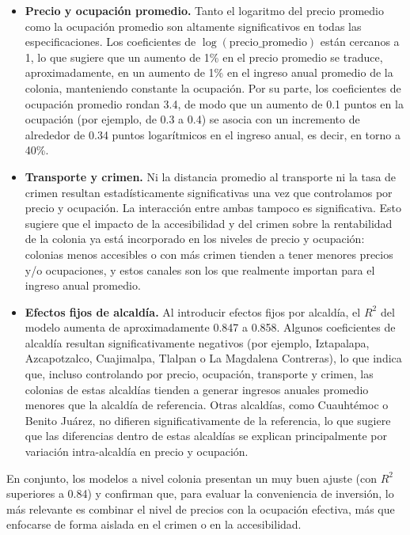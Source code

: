 \documentclass[12pt]{article}
\begin{document}
\begin{itemize}
  \item \textbf{Precio y ocupación promedio.} Tanto el logaritmo del precio promedio como la ocupación promedio son altamente significativos en todas las especificaciones. Los coeficientes de \(\log(\text{precio\_promedio})\) están cercanos a 1, lo que sugiere que un aumento de 1\% en el precio promedio se traduce, aproximadamente, en un aumento de 1\% en el ingreso anual promedio de la colonia, manteniendo constante la ocupación. Por su parte, los coeficientes de ocupación promedio rondan 3.4, de modo que un aumento de 0.1 puntos en la ocupación (por ejemplo, de 0.3 a 0.4) se asocia con un incremento de alrededor de 0.34 puntos logarítmicos en el ingreso anual, es decir, en torno a 40\%.
  \item \textbf{Transporte y crimen.} Ni la distancia promedio al transporte ni la tasa de crimen resultan estadísticamente significativas una vez que controlamos por precio y ocupación. La interacción entre ambas tampoco es significativa. Esto sugiere que el impacto de la accesibilidad y del crimen sobre la rentabilidad de la colonia ya está incorporado en los niveles de precio y ocupación: colonias menos accesibles o con más crimen tienden a tener menores precios y/o ocupaciones, y estos canales son los que realmente importan para el ingreso anual promedio.
  \item \textbf{Efectos fijos de alcaldía.} Al introducir efectos fijos por alcaldía, el \(R^2\) del modelo aumenta de aproximadamente 0.847 a 0.858. Algunos coeficientes de alcaldía resultan significativamente negativos (por ejemplo, Iztapalapa, Azcapotzalco, Cuajimalpa, Tlalpan o La Magdalena Contreras), lo que indica que, incluso controlando por precio, ocupación, transporte y crimen, las colonias de estas alcaldías tienden a generar ingresos anuales promedio menores que la alcaldía de referencia. Otras alcaldías, como Cuauhtémoc o Benito Juárez, no difieren significativamente de la referencia, lo que sugiere que las diferencias dentro de estas alcaldías se explican principalmente por variación intra-alcaldía en precio y ocupación.
\end{itemize}

En conjunto, los modelos a nivel colonia presentan un muy buen ajuste (con \(R^2\) superiores a 0.84) y confirman que, para evaluar la conveniencia de inversión, lo más relevante es combinar el nivel de precios con la ocupación efectiva, más que enfocarse de forma aislada en el crimen o en la accesibilidad.
\end{document}
